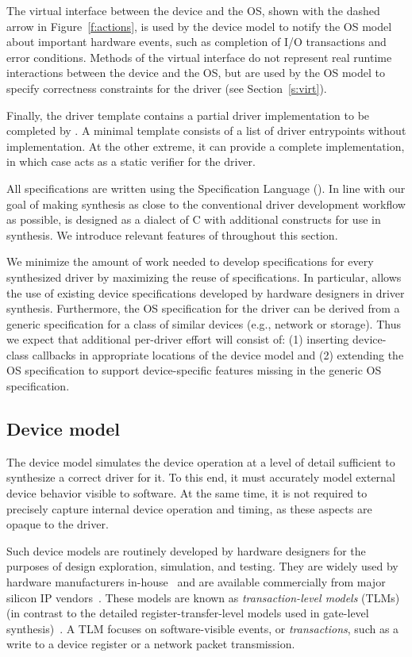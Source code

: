 The virtual interface between the device and the OS, shown with the dashed arrow in Figure~\ref{f:actions}, is used by the device model to notify the OS model about important hardware events, such as completion of I/O transactions and error conditions.  Methods of the virtual interface do not represent real runtime interactions between the device and the OS, but are used by the OS model to specify correctness constraints for the driver (see Section~\ref{s:virt}).

Finally, the driver template contains a partial driver implementation to be completed by \termite.  A minimal template consists of a list of driver entrypoints without implementation.  At the other extreme, it can provide a complete implementation, in which case \termite acts as a static verifier for the driver.

All specifications are written using the \termite Specification Language (\tsl).  In line with our goal of making synthesis as close to the conventional driver development workflow as possible, \tsl is designed as a dialect of C with additional constructs for use in synthesis.  We introduce relevant features of \tsl throughout this section.

We minimize the amount of work needed to develop specifications for every synthesized driver by maximizing the reuse of specifications.  In particular, \termite allows the use of existing device specifications developed by hardware designers in driver synthesis.  Furthermore, the OS specification for the driver can be derived from a generic specification for a class of similar devices (e.g., network or storage).  Thus we expect that additional per-driver effort will consist of: (1) inserting device-class callbacks in appropriate locations of the device model and (2) extending the OS specification to support device-specific features missing in the  generic OS specification.

\subsection{Device model}

The device model simulates the device operation at a level of detail sufficient to synthesize a correct driver for it.  To this end, it must accurately model external device behavior visible to software.  At the same time, it is not required to precisely capture internal device operation and timing, as these aspects are opaque to the driver.

Such device models are routinely developed by hardware designers for the purposes of design exploration, simulation, and testing. They are widely used by hardware manufacturers in-house~\cite{cofluent} and are available commercially from major silicon IP vendors~\cite{vp}.  These models are known as \emph{transaction-level models} (TLMs) (in contrast to the detailed register-transfer-level models used in gate-level synthesis)~\cite{Cai_Gajski_03}.  A TLM focuses on software-visible events, or \emph{transactions}, such as a write to a device register or a network packet transmission.

